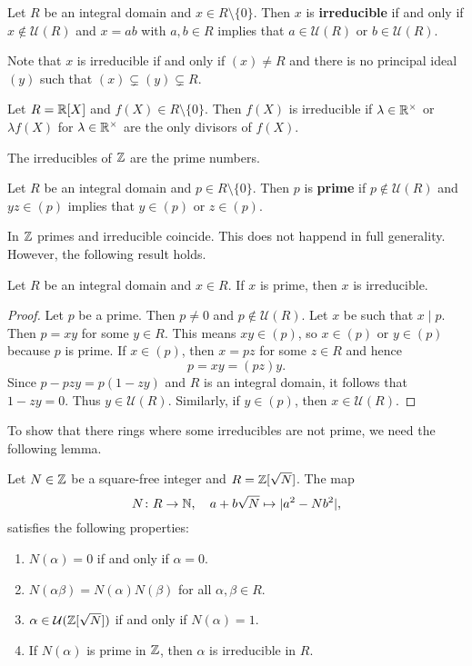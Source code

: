 \begin{definition}
	Let $R$ be an integral domain and $x\in R\setminus\{0\}$. Then $x$ is \textbf{irreducible} 
	if and only if $x\not\in\mathcal{U}(R)$ 
	and $x=ab$ with $a,b\in R$ implies that $a\in\mathcal{U}(R)$ or $b\in\mathcal{U}(R)$. 
\end{definition}

Note that $x$ is irreducible if and only if $(x)\ne R$ 
and there is no principal ideal $(y)$ such that 
$(x)\subsetneq (y)\subsetneq R$.

\begin{example}
	Let $R=\mathbb{R}[X]$ and $f(X)\in R\setminus\{0\}$. Then $f(X)$ is irreducible if 
	$\lambda\in\mathbb{R}^{\times}$ or $\lambda f(X)$ for $\lambda\in\mathbb{R}^{\times}$ 
	are the only divisors
	of $f(X)$.  
\end{example}

The irreducibles of $\mathbb{Z}$ are the prime numbers. 

\begin{definition}
	Let $R$ be an integral domain and $p\in R\setminus\{0\}$. Then  
	$p$ is \textbf{prime} if $p\not\in\mathcal{U}(R)$ and 
	$yz\in (p)$ implies that $y\in (p)$ or $z\in (p)$. 
\end{definition}

In $\mathbb{Z}$ primes and irreducible coincide. This does not happend in full generality. However,
the following result holds. 

\begin{proposition}
	Let $R$ be an integral domain and $x\in R$. 
	If $x$ is prime, then $x$ is irreducible. 
\end{proposition}

\begin{proof}
	Let $p$ be a prime. Then $p\ne 0$ and $p\not\in\mathcal{U}(R)$. Let $x$ be such that
	$x\mid p$. Then $p=xy$ for some $y\in R$. This means $xy\in (p)$, 
	so $x\in (p)$ or $y\in (p)$ because
	$p$ is prime. If $x\in (p)$, then $x=pz$ for some $z\in R$ and hence
	\[
	p=xy=(pz)y.
	\]
	Since $p-pzy=p(1-zy)$ and $R$ is an integral domain, it follows that 
	$1-zy=0$. Thus $y\in\mathcal{U}(R)$. Similarly, if $y\in (p)$, then 
	$x\in\mathcal{U}(R)$. 
\end{proof}

To show that there rings where some irreducibles are not prime, 
we need the following lemma. 

\begin{lemma}
Let $N\in\mathbb{Z}$ be a square-free integer and $R=\mathbb{Z}[\sqrt{N}]$. The map 
\[
N\colon R\to\mathbb{N},
\quad a+b\sqrt{N}\mapsto 
|a^2-Nb^2|,
\]
satisfies the following properties:
\begin{enumerate}
	\item $N(\alpha)=0$ if and only if $\alpha=0$. 
	\item $N(\alpha\beta)=N(\alpha)N(\beta)$ for all $\alpha,\beta\in R$. 
	\item $\alpha\in\mathcal{U}(\mathbb{Z}[\sqrt{N}])$ if and only if $N(\alpha)=1$. 
	\item If $N(\alpha)$ is prime in $\mathbb{Z}$, then $\alpha$ is irreducible in $R$. 
\end{enumerate}	
\end{lemma}

